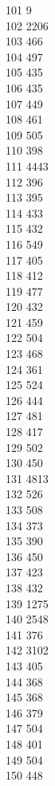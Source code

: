 { 101	9 \\
 102	2206 \\
 103	466 \\
 104	497 \\
 105	435 \\
 106	435 \\
 107	449 \\
 108	461 \\
 109	505 \\
 110	398 \\
 111	4443 \\
 112	396 \\
 113	395 \\
 114	433 \\
 115	432 \\
 116	549 \\
 117	405 \\
 118	412 \\
 119	477 \\
 120	432 \\
 121	459 \\
 122	504 \\
 123	468 \\
 124	361 \\
 125	524 \\
 126	444 \\
 127	481 \\
 128	417 \\
 129	502 \\
 130	450 \\
 131	4813 \\
 132	526 \\
 133	508 \\
 134	373 \\
 135	390 \\
 136	450 \\
 137	423 \\
 138	432 \\
 139	1275 \\
 140	2548 \\
 141	376 \\
 142	3102 \\
 143	405 \\
 144	368 \\
 145	368 \\
 146	379 \\
 147	504 \\
 148	401 \\
 149	504 \\
 150	448 \\
}

